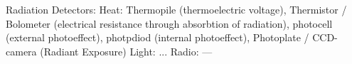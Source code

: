 Radiation Detectors:
\vspace{2ex} \newline 
Heat: Thermopile (thermoelectric voltage), Thermistor / Bolometer (electrical resistance through absorbtion of radiation), photocell (external photoeffect), photpdiod (internal photoeffect), Photoplate / CCD-camera (Radiant Exposure) 
\vspace{2ex} \newline 
Light: ...
Radio: ---
